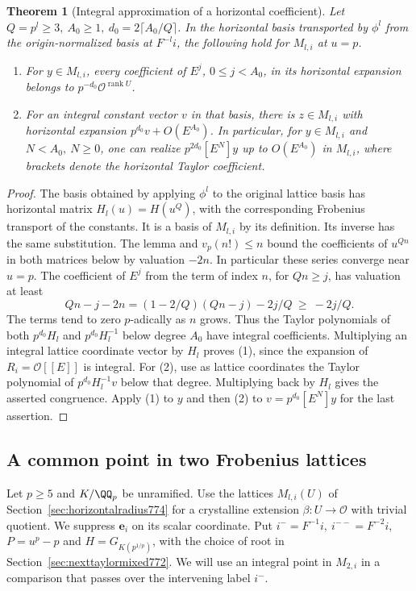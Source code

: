 \documentclass[a4paper,11pt]{article}
\newtheorem{theorem}[proposition]{Theorem}
\theoremstyle{definition}
\theoremstyle{remark}
\numberwithin{equation}{section}
\begin{document}
\begin{theorem}[Integral approximation of a horizontal coefficient]
\leavevmode\label{thm:frobeniusjet774}
Let \(Q=p^l\ge3,\ A_0\ge1,\ d_0=2\lceil A_0/Q\rceil\).
In the horizontal basis transported by \(\phi^l\) from the
origin-normalized basis at \(F^{-l}i\), the following hold
for \(M_{l,i}\) at \(u=p\).
\begin{enumerate}
\item For \(y\in M_{l,i}\), every coefficient of \(E^j\),
\(0\le j<A_0\), in its horizontal expansion belongs to
\(p^{-d_0}\mathcal O^{\operatorname{rank}U}\).
\item For an integral constant vector \(v\) in that basis,
there is \(z\in M_{l,i}\) with horizontal expansion
\(p^{d_0}v+O(E^{A_0})\). In particular, for \(y\in M_{l,i}\)
and \(N<A_0,\ N\ge0\), one can realize
\(p^{2d_0}[E^N]y\) up to \(O(E^{A_0})\) in \(M_{l,i}\),
where brackets denote the horizontal Taylor coefficient.
\end{enumerate}
\end{theorem}
\begin{proof}
The basis obtained by applying \(\phi^l\) to the original
lattice basis has horizontal matrix \(H_l(u)=H(u^Q)\),
with the corresponding Frobenius transport of the constants.
It is a basis of \(M_{l,i}\) by its definition. Its inverse
has the same substitution. The lemma and \(v_p(n!)\le n\)
bound the coefficients of \(u^{Qn}\) in both matrices
below by valuation \(-2n\). In particular these series
converge near \(u=p\). The coefficient of \(E^j\) from
the term of index \(n\), for \(Qn\ge j\), has valuation at
least
\[
       Qn-j-2n=(1-2/Q)(Qn-j)-2j/Q\ \ge\ -2j/Q.
\]
The terms tend to zero \(p\)-adically as \(n\) grows.
Thus the Taylor polynomials of both \(p^{d_0}H_l\) and
\(p^{d_0}H_l^{-1}\) below degree \(A_0\) have integral
coefficients. Multiplying an integral lattice coordinate
vector by \(H_l\) proves (1), since the expansion of
\(R_i=\mathcal O[[E]]\) is integral. For (2), use as lattice
coordinates the Taylor polynomial of \(p^{d_0}H_l^{-1}v\)
below that degree. Multiplying back by \(H_l\) gives the
asserted congruence. Apply (1) to \(y\) and then (2) to
\(v=p^{d_0}[E^N]y\) for the last assertion.
\end{proof}
\clearpage

\subsection{A common point in two Frobenius lattices}
\label{sec:secondpoint775}
Let \(p\ge5\) and \(K/\QQ_p\) be unramified. Use the
lattices \(M_{l,i}(U)\) of Section~\ref{sec:horizontalradius774}
for a crystalline extension \(\beta:U\to\mathcal O\) with
trivial quotient. We suppress \(\mathbf e_i\) on its scalar
coordinate. Put \(i^-=F^{-1}i,\ i^{--}=F^{-2}i\),
\(P=u^p-p\) and \(H=G_{K(p^{1/p})}\), with the choice of
root in Section~\ref{sec:nexttaylormixed772}. We will use
an integral point in \(M_{2,i}\) in a comparison that
passes over the intervening label \(i^-\).
\end{document}
